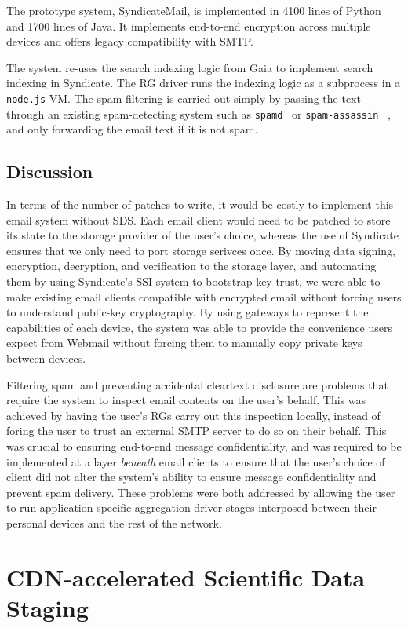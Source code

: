 The prototype system, SyndicateMail, is implemented in 4100 lines of Python and
1700 lines of Java.  It implements end-to-end encryption across multiple devices
and offers legacy compatibility with SMTP.

The system re-uses the search indexing
logic from Gaia to implement search indexing in Syndicate.  The RG
driver runs the indexing logic as a subprocess in a \texttt{node.js} VM.  The
spam filtering is carried out simply by passing the text through an existing
spam-detecting system such as \texttt{spamd}~\cite{spamd} or \texttt{spam-assassin}
~\cite{spam-assassin}, and only forwarding the email text if it is not spam.

\subsection{Discussion}

In terms of the number of patches to write, it would be costly to implement this email system without
SDS.  Each email client would need to be patched to store its state to the
storage provider of the user's choice, whereas the use of Syndicate ensures that
we only need to port storage serivces once.  By moving data signing,
encryption, decryption, and verification to the storage layer, and automating
them by using Syndicate's SSI system to bootstrap key trust, we were able to
make existing email clients compatible with encrypted email without forcing
users to understand public-key cryptography.  By using gateways to represent the
capabilities of each device, the system was able to provide the convenience users expect from Webmail
without forcing them to manually copy private keys between devices.

Filtering spam and preventing accidental cleartext disclosure are problems
that require the system to inspect email contents on the user's behalf.  This
was achieved by having the user's RGs carry out this inspection locally,
instead of foring the user to trust an external SMTP server to do so on their
behalf.  This was crucial to ensuring end-to-end message confidentiality, and
was required to be implemented at a layer \emph{beneath} email clients to ensure
that the user's choice of client did not alter the system's ability to ensure
message confidentiality and prevent spam delivery.  These problems
were both addressed by allowing the user to run application-specific aggregation driver
stages interposed between their personal devices and the rest of the network.

\section{CDN-accelerated Scientific Data Staging}

